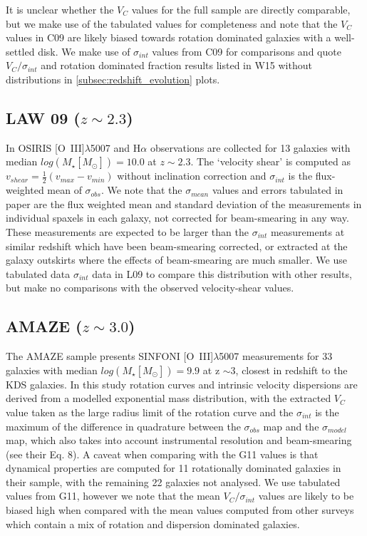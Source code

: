\documentclass[fleqn,usenatbib]{mn2e}
\begin{document}
It is unclear whether the $V_{C}$ values for the full sample are directly comparable, but we make use of the tabulated values for completeness and note that the $V_{C}$ values in C09 are likely biased towards rotation dominated galaxies with a well-settled disk.
We make use of $\sigma_{int}$ values from C09 for comparisons and quote $V_{C}/\sigma_{int}$ and rotation dominated fraction results listed in W15 without distributions in \cref{subsec:redshift_evolution} plots.

\subsection{LAW 09 ($z\sim2.3$)}\label{subsec:law_09}
In \cite[L09]{Law2009} OSIRIS [O~{\sc III}]$\lambda$5007 and H$\alpha$ observations are collected for 13 galaxies with median $log(M_{\star}[M_{\odot}])=10.0$ at $z\sim2.3$.
The `velocity shear' is computed as $v_{shear} = \frac{1}{2}(v_{max} - v_{min})$ without inclination correction and $\sigma_{int}$ is the flux-weighted mean of $\sigma_{obs}$.
We note that the $\sigma_{mean}$ values and errors tabulated in \cite{Law2009} paper are the flux weighted mean and standard deviation of the measurements in individual spaxels in each galaxy, not corrected for beam-smearing in any way.
These measurements are expected to be larger than the $\sigma_{int}$ measurements at similar redshift which have been beam-smearing corrected, or extracted at the galaxy outskirts where the effects of beam-smearing are much smaller.
We use tabulated data $\sigma_{int}$ data in L09 to compare this distribution with other results, but make no comparisons with the observed velocity-shear values.

\subsection{AMAZE ($z\sim3.0$)}\label{subsec:AMAZE}
The AMAZE sample \cite[G11]{Gnerucci2011} presents SINFONI [O~{\sc III}]$\lambda$5007 measurements for 33 galaxies with median $log(M_{\star}[M_{\odot}])=9.9$ at z $\sim 3$, closest in redshift to the KDS galaxies.
In this study rotation curves and intrinsic velocity dispersions are derived from a modelled exponential mass distribution, with the extracted $V_{C}$ value taken as the large radius limit of the rotation curve and the $\sigma_{int}$ is the maximum of the difference in quadrature between the $\sigma_{obs}$ map and the $\sigma_{model}$ map, which also takes into account instrumental resolution and beam-smearing (see their Eq. 8).
A caveat when comparing with the G11 values is that dynamical properties are computed for 11 rotationally dominated galaxies in their sample, with the remaining 22 galaxies not analysed.
We use tabulated values from G11, however we note that the mean $V_{C}/\sigma_{int}$ values are likely to be biased high when compared with the mean values computed from other surveys which contain a mix of rotation and dispersion dominated galaxies. \\
\end{document}
